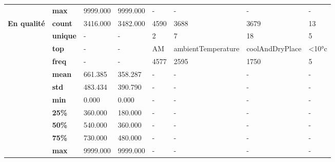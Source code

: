 \begin{tabularx}{\linewidth}{lXXXXXXX}
           & \textbf{max} &             9999.000 &                 9999.000 &                    - &                       - &                       - &           - \\
\cline{1-8}
\multirow{11}{*}{\textbf{En qualité}} & \textbf{count} &             3416.000 &                 3482.000 &                 4590 &                    3688 &                    3679 &          13 \\
           & \textbf{unique} &                    - &                        - &                    2 &                       7 &                      18 &           5 \\
           & \textbf{top} &                    - &                        - &                   AM &      ambientTemperature &         coolAndDryPlace &       <10°c \\
           & \textbf{freq} &                    - &                        - &                 4577 &                    2595 &                    1750 &           5 \\
           & \textbf{mean} &              661.385 &                  358.287 &                    - &                       - &                       - &           - \\
           & \textbf{std} &              483.434 &                  390.790 &                    - &                       - &                       - &           - \\
           & \textbf{min} &                0.000 &                    0.000 &                    - &                       - &                       - &           - \\
           & \textbf{25\%} &              360.000 &                  180.000 &                    - &                       - &                       - &           - \\
           & \textbf{50\%} &              540.000 &                  360.000 &                    - &                       - &                       - &           - \\
           & \textbf{75\%} &              730.000 &                  480.000 &                    - &                       - &                       - &           - \\
           & \textbf{max} &             9999.000 &                 9999.000 &                    - &                       - &                       - &           - \\
\bottomrule
\end{tabularx}
